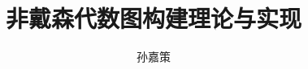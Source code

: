 \documentclass[bachelor, english]{ustcthesis}
\title{非戴森代数图构建理论与实现}
\author{孙嘉策}
\begin{document}
\maketitle
\makestatement

\frontmatter

\tableofcontents


\mainmatter







\appendix


\backmatter


\end{document}

